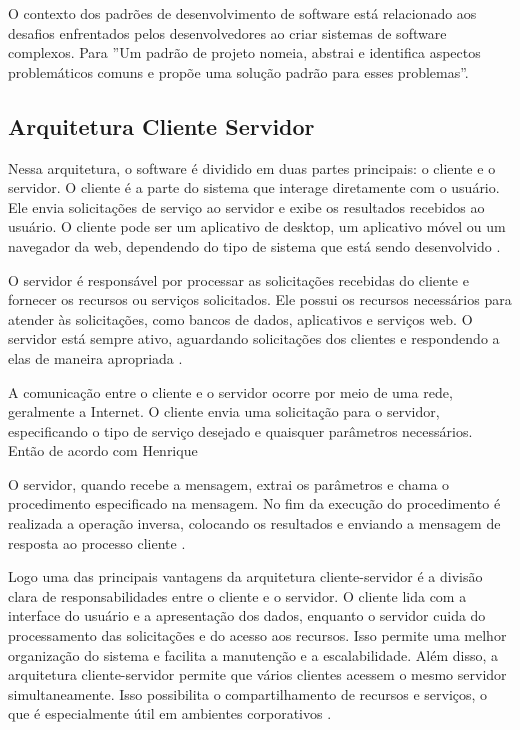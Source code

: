 O contexto dos padrões de desenvolvimento de software está relacionado aos desafios enfrentados pelos desenvolvedores ao criar sistemas de software complexos. Para \cite{padroesProjeto} ''Um padrão de projeto nomeia, abstrai e identifica aspectos problemáticos comuns e propõe uma solução padrão para esses problemas''.


\subsection{Arquitetura Cliente Servidor}
Nessa arquitetura, o software é dividido em duas partes principais: o cliente e o servidor.
O cliente é a parte do sistema que interage diretamente com o usuário. Ele envia solicitações de serviço ao servidor e exibe os resultados recebidos ao usuário. O cliente pode ser um aplicativo de desktop, um aplicativo móvel ou um navegador da web, dependendo do tipo de sistema que está sendo desenvolvido \cite{flanagan2012javascript}.

O servidor é responsável por processar as solicitações recebidas do cliente e fornecer os recursos ou serviços solicitados. Ele possui os recursos necessários para atender às solicitações, como bancos de dados, aplicativos e serviços web. O servidor está sempre ativo, aguardando solicitações dos clientes e respondendo a elas de maneira apropriada \cite{arqClientServer2}.

A comunicação entre o cliente e o servidor ocorre por meio de uma rede, geralmente a Internet. O cliente envia uma solicitação para o servidor, especificando o tipo de serviço desejado e quaisquer parâmetros necessários.
Então de acordo com Henrique
\begin{citacao}
O servidor, quando recebe a mensagem, extrai os parâmetros 
e chama o procedimento especificado na mensagem. No fim da execução do procedimento é 
realizada a operação inversa, colocando os resultados e enviando a mensagem de resposta ao 
processo cliente \cite{arqClientServer2}.
\end{citacao}

    Logo uma das principais vantagens da arquitetura cliente-servidor é a divisão clara de responsabilidades entre o cliente e o servidor. 
O cliente lida com a interface do usuário e a apresentação dos dados, enquanto o servidor cuida do processamento das solicitações e do acesso aos recursos. Isso permite uma melhor organização do sistema e facilita a manutenção e a escalabilidade.
Além disso, a arquitetura cliente-servidor permite que vários clientes acessem o mesmo servidor simultaneamente. Isso possibilita o compartilhamento de recursos e serviços, o que é especialmente útil em ambientes corporativos \cite{arqClientServer2}.


